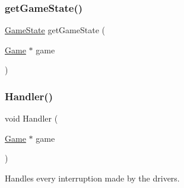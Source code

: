 \subsubsection{\texorpdfstring{getGameState()}{getGameState()}}
{\footnotesize\ttfamily \mbox{\hyperlink{group__game_ga7899b65f1ea0f655e4bbf8d2a5714285}{Game\+State}} get\+Game\+State (\begin{DoxyParamCaption}\item[{\mbox{\hyperlink{struct_game}{Game}} $\ast$}]{game }\end{DoxyParamCaption})}

\mbox{\label{group__game_ga5b0e92642a5a6f7584bf752ebf7d91e6}} 
\subsubsection{\texorpdfstring{Handler()}{Handler()}}
{\footnotesize\ttfamily void Handler (\begin{DoxyParamCaption}\item[{\mbox{\hyperlink{struct_game}{Game}} $\ast$}]{game }\end{DoxyParamCaption})}



Handles every interruption made by the drivers. 


